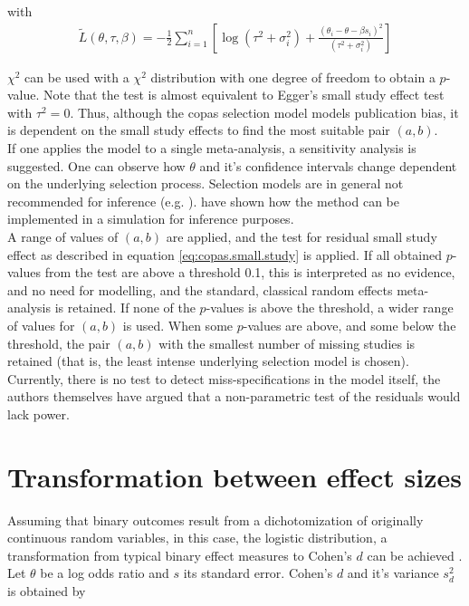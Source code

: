 \documentclass[11pt,a4paper,twoside]{book}\usepackage[]{graphicx}\usepackage[]{color}
\begin{document}
with 
\begin{align}
\tilde{L}(\theta, \tau, \beta) = -\frac{1}{2}\sum_{i = 1}^n[\log(\tau^2 + \sigma_i^2) + \frac{(\theta_i - \theta - \beta s_i)^2}{(\tau^2 + \sigma_i^2)}] \nonumber
\end{align}

$\chi^2$ can be used with a $\chi^2$ distribution with one degree of freedom to obtain a $p$-value. Note that the test is almost equivalent to Egger's small study effect test with $\tau^2 = 0$. Thus, although the copas selection model models publication bias, it is dependent on the small study effects to find the most suitable pair $(a,b)$. \\
If one applies the model to a single meta-analysis, a sensitivity analysis is suggested. One can observe how $\theta$ and it's confidence intervals change dependent on the underlying selection process. Selection models are in general not recommended for inference (e.g. \citet{selection.assessment}). 
\citet{limitmeta} have shown how the method can be implemented in a simulation for inference purposes. \\
A range of values of $(a,b)$ are applied, and the test for residual small study effect as described in equation \ref{eq:copas.small.study} is applied. If all obtained $p$-values from the test are above a threshold 0.1, this is interpreted as no evidence, and no need for modelling, and the standard, classical random effects meta-analysis is retained. If none of the $p$-values is above the threshold, a wider range of values for $(a,b)$ is used. When some $p$-values are above, and some below the threshold, the pair $(a,b)$ with the smallest number of missing studies is retained (that is, the least intense underlying selection model is chosen).\\
Currently, there is no test to detect miss-specifications in the model itself, the authors themselves have argued that a non-parametric test of the residuals would lack power.


\section{Transformation between effect sizes} \label{sec:transformation.effectsizes}
Assuming that binary outcomes result from a dichotomization of originally continuous random variables, in this case, the logistic distribution, a transformation from typical binary effect measures to Cohen's $d$ can be achieved \cite[47]{Intro.meta}. \\
Let $\theta$ be a log odds ratio and $s$ its standard error. Cohen's $d$ and it's variance $s_d^2$ is obtained by
\end{document}
